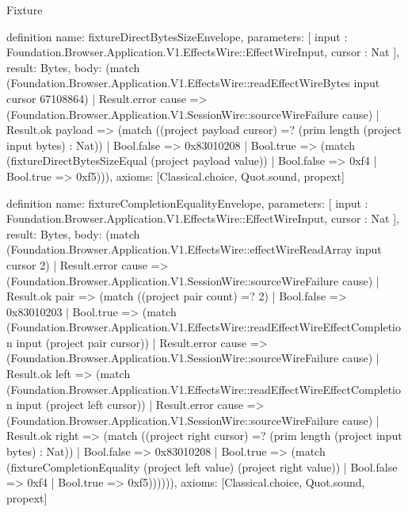 \begin{lexlean}{Fixture}
\begin{semanticmodule}
definition{
  name: fixtureDirectBytesSizeEnvelope,
  parameters: [
    input : Foundation.Browser.Application.V1.EffectsWire::EffectWireInput,
    cursor : Nat
  ],
  result: Bytes,
  body: (match (Foundation.Browser.Application.V1.EffectsWire::readEffectWireBytes input cursor 67108864)
    | Result.error cause => (Foundation.Browser.Application.V1.SessionWire::sourceWireFailure cause)
    | Result.ok payload => (match ((project payload cursor) =? (prim length (project input bytes) : Nat))
      | Bool.false => 0x83010208
      | Bool.true => (match (fixtureDirectBytesSizeEqual (project payload value))
        | Bool.false => 0xf4
        | Bool.true => 0xf5))),
  axioms: [Classical.choice, Quot.sound, propext]
}

definition{
  name: fixtureCompletionEqualityEnvelope,
  parameters: [
    input : Foundation.Browser.Application.V1.EffectsWire::EffectWireInput,
    cursor : Nat
  ],
  result: Bytes,
  body: (match (Foundation.Browser.Application.V1.EffectsWire::effectWireReadArray input cursor 2)
    | Result.error cause => (Foundation.Browser.Application.V1.SessionWire::sourceWireFailure cause)
    | Result.ok pair => (match ((project pair count) =? 2)
      | Bool.false => 0x83010203
      | Bool.true => (match (Foundation.Browser.Application.V1.EffectsWire::readEffectWireEffectCompletion input (project pair cursor))
        | Result.error cause => (Foundation.Browser.Application.V1.SessionWire::sourceWireFailure cause)
        | Result.ok left => (match (Foundation.Browser.Application.V1.EffectsWire::readEffectWireEffectCompletion input (project left cursor))
          | Result.error cause => (Foundation.Browser.Application.V1.SessionWire::sourceWireFailure cause)
          | Result.ok right => (match ((project right cursor) =? (prim length (project input bytes) : Nat))
            | Bool.false => 0x83010208
            | Bool.true => (match (fixtureCompletionEquality (project left value) (project right value))
              | Bool.false => 0xf4
              | Bool.true => 0xf5)))))),
  axioms: [Classical.choice, Quot.sound, propext]
}


\end{semanticmodule}
\end{lexlean}
